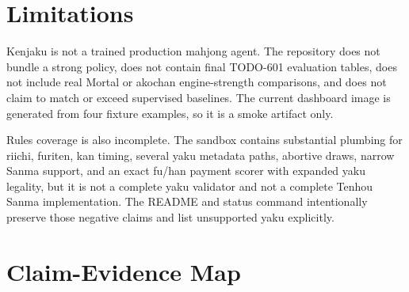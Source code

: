 \documentclass[11pt]{article}
\begin{document}
\section{Limitations}

Kenjaku is not a trained production mahjong agent. The repository does not bundle a strong policy,
does not contain final TODO-601 evaluation tables, does not include real Mortal or akochan
engine-strength comparisons, and does not claim to match or exceed supervised baselines. The
current dashboard image is generated from four fixture examples, so it is a smoke artifact only.

Rules coverage is also incomplete. The sandbox contains substantial plumbing for riichi, furiten,
kan timing, several yaku metadata paths, abortive draws, narrow Sanma support, and an exact fu/han
payment scorer with expanded yaku legality, but it is not a complete yaku validator and not a
complete Tenhou Sanma implementation. The README and status command intentionally preserve those
negative claims and list unsupported yaku explicitly.

\clearpage
\section{Claim-Evidence Map}
\end{document}
